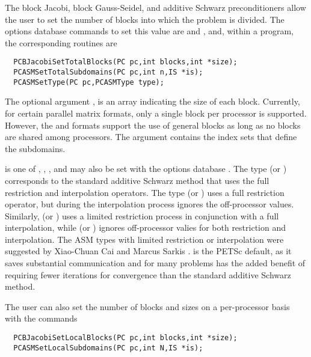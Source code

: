The block Jacobi, block Gauss-Seidel, and additive Schwarz 
preconditioners allow the user
to set the number of blocks into which the problem is divided.  The
options database commands to set this value are 
and , and, within a program, the corresponding routines
are  
  
\begin{verbatim}
  PCBJacobiSetTotalBlocks(PC pc,int blocks,int *size);
  PCASMSetTotalSubdomains(PC pc,int n,IS *is);
  PCASMSetType(PC pc,PCASMType type);
\end{verbatim}
The 
optional argument , is an array indicating the size of
each block. Currently, for certain parallel matrix formats, only a
single block per processor is supported. However, the  and 
 formats
support the use of general blocks as long as no blocks are shared
among processors. The  argument contains the index sets that
define the subdomains. 

 is one of ,
, , 
and may also be set with the options database .
   
  
The type  (or ) corresponds to the
standard additive Schwarz method that uses the full restriction and
interpolation operators.
The type  (or ) uses a full
restriction operator, but during the interpolation process ignores the off-processor
values.
Similarly,  (or ) uses a limited
restriction process in conjunction with a full interpolation, while
 (or ) ignores off-processor valies
for both restriction and interpolation.
The ASM types with limited restriction or interpolation were suggested by 
Xiao-Chuan Cai and Marcus Sarkis \cite{cs97a}.    
 is the PETSc default, as it saves substantial communication
and for many problems has the added benefit of requiring fewer iterations for convergence
than the standard additive Schwarz method.

The user can also set the number of blocks and sizes on a per-processor
basis with the commands
\begin{verbatim}
  PCBJacobiSetLocalBlocks(PC pc,int blocks,int *size);
  PCASMSetLocalSubdomains(PC pc,int N,IS *is);
\end{verbatim}

